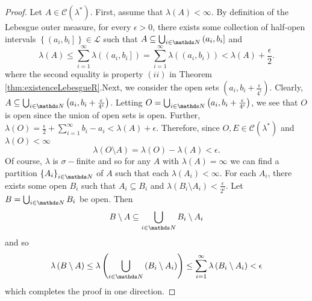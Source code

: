 \begin{proof}
Let $A\in\mathcal{C}\left(\lambda^{*}\right)$. First, assume that
$\lambda\left(A\right)<\infty.$ By definition of the Lebesgue outer
measure, for every $\epsilon>0$, there exists some collection of
half-open intervals $\left\{ \left(a_{i},b_{i}\right]\right\} \in\mathcal{L}$
such that $A\subseteq\bigcup_{i\in\N}\left(a_{i},b_{i}\right]$ and
\[
\lambda\left(A\right)\leq\sum_{i=1}^{\infty}\lambda\left(\left(a_{i},b_{i}\right]\right)=\sum_{i=1}^{\infty}\lambda\left(\left(a_{i},b_{i}\right)\right)<\lambda\left(A\right)+\frac{\epsilon}{2}.
\]
where the second equality is property $\left(ii\right)$ in Theorem
\ref{thm:existenceLebesgueR}.Next, we consider the open sets $\left(a_{i},b_{i}+\frac{\epsilon}{4^{i}}\right)$.
Clearly, $A\subseteq\bigcup_{i\in\N}\left(a_{i},b_{i}+\frac{\epsilon}{4^{i}}\right)$.
Letting $O=\bigcup_{i\in\N}\left(a_{i},b_{i}+\frac{\epsilon}{4^{i}}\right)$,
we see that $O$ is open since the union of open sets is open. Further,
$\lambda\left(O\right)=\frac{\epsilon}{2}+\sum_{i=1}^{\infty}b_{i}-a_{i}<\lambda\left(A\right)+\epsilon$.
Therefore, since $O,E\in\mathcal{C}\left(\lambda^{*}\right)$ and
$\lambda\left(O\right)<\infty$
\[
\lambda\left(O\setminus A\right)=\lambda\left(O\right)-\lambda\left(A\right)<\epsilon.
\]
 Of course, $\lambda$ is $\sigma-$finite and so for any $A$ with
$\lambda\left(A\right)=\infty$ we can find a partition $\left\{ A_{i}\right\} _{i\in\N}$
of $A$ such that each $\lambda\left(A_{i}\right)<\infty$. For each
$A_{i}$, there exists some open $B_{i}$ such that $A_{i}\subseteq B_{i}$
and $\lambda\left(B_{i}\setminus A_{i}\right)<\frac{\epsilon}{2^{i}}$.
Let $B=\bigcup_{i\in\N}B_{i}$ be open. Then
\[
B\setminus A\subseteq\bigcup_{i\in\N}B_{i}\setminus A_{i}
\]
and so 
\[
\lambda\left(B\setminus A\right)\leq\lambda\left(\bigcup_{i\in\N}\left(B_{i}\setminus A_{i}\right)\right)\leq\sum_{i=1}^{\infty}\lambda\left(B_{i}\setminus A_{i}\right)<\epsilon
\]
which completes the proof in one direction.


\end{proof}
